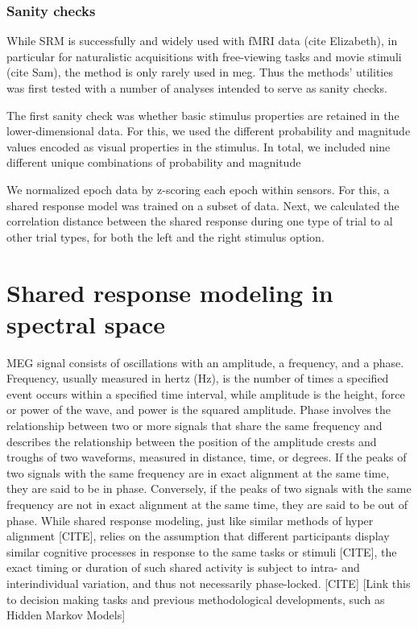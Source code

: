 
\subsubsection{Sanity checks}

While \gls{SRM} is successfully and widely used with fMRI data (cite Elizabeth), in particular for naturalistic acquisitions with free-viewing tasks and movie stimuli (cite Sam), the method is only rarely used in \gls{meg}.
Thus the methods' utilities was first tested with a number of analyses intended to serve as sanity checks.

The first sanity check was whether basic stimulus properties are retained in the lower-dimensional data.
For this, we used the different probability and magnitude values encoded as visual properties in the stimulus.
In total, we included nine different unique combinations of probability and magnitude

We normalized epoch data by z-scoring each epoch within sensors.
For this, a shared response model was trained on a subset of data.
Next, we calculated the correlation distance between the shared response during one type of trial to al other trial types, for both the left and the right stimulus option.


\section{Shared response modeling in spectral space}

MEG signal consists of oscillations with an amplitude, a frequency, and a phase.
Frequency, usually measured in hertz (Hz), is the number of times a specified event occurs within a specified time interval, while amplitude is the height, force or power of the wave, and power is the squared amplitude.
Phase involves the relationship between two or more signals that share the same frequency and describes the relationship between the position of the amplitude crests and troughs of two waveforms, measured in distance, time, or degrees.
If the peaks of two signals with the same frequency are in exact alignment at the same time, they are said to be in phase.
Conversely, if the peaks of two signals with the same frequency are not in exact alignment at the same time, they are said to be out of phase.
While shared response modeling, just like similar methods of hyper alignment [CITE], relies on the assumption that different participants display similar cognitive processes in response to the same tasks or stimuli [CITE], the exact timing or duration of such shared activity is subject to intra- and interindividual variation, and thus not necessarily phase-locked. [CITE]
[Link this to decision making tasks and previous methodological developments, such as Hidden Markov Models]

